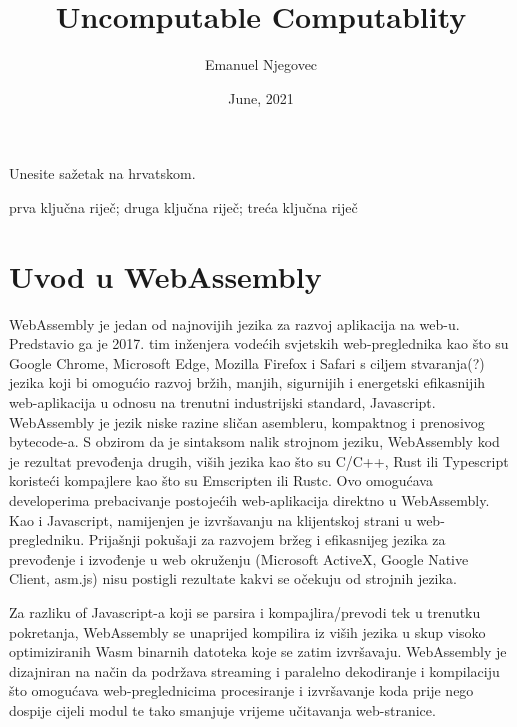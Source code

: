 \documentclass[seminarskirad]{fer}
\title{Uncomputable Computablity}
\author{Emanuel Njegovec}
\date{June, 2021}
\begin{document}
\maketitle


\mainmatter



\begin{sazetak}
  Unesite sažetak na hrvatskom.

  \blindtext
\end{sazetak}

\begin{kljucnerijeci}
  prva ključna riječ; druga ključna riječ; treća ključna riječ
\end{kljucnerijeci}


\tableofcontents


\chapter{Uvod u WebAssembly}
\label{pog:uvod}

WebAssembly je jedan od najnovijih jezika za razvoj aplikacija na web-u. Predstavio ga je 2017. tim inženjera vodećih svjetskih web-preglednika kao što su Google Chrome, Microsoft Edge, Mozilla Firefox i Safari s ciljem stvaranja(?) jezika koji bi omogućio razvoj bržih, manjih, sigurnijih i energetski efikasnijih web-aplikacija u odnosu na trenutni industrijski standard, Javascript. WebAssembly je jezik niske razine sličan asembleru, kompaktnog i prenosivog bytecode-a. S obzirom da je sintaksom nalik strojnom jeziku, WebAssembly kod je rezultat prevođenja drugih, viših jezika kao što su C/C++, Rust ili Typescript koristeći kompajlere kao što su Emscripten ili Rustc. Ovo omogućava developerima prebacivanje postojećih web-aplikacija direktno u WebAssembly. Kao i Javascript, namijenjen je izvršavanju na klijentskoj strani u web-pregledniku. Prijašnji pokušaji za razvojem bržeg i efikasnijeg jezika za prevođenje i izvođenje u web okruženju (Microsoft ActiveX, Google Native Client, asm.js) nisu postigli rezultate kakvi se očekuju od strojnih jezika.

Za razliku of Javascript-a koji se parsira i kompajlira/prevodi tek u trenutku pokretanja, WebAssembly se unaprijed kompilira iz viših jezika u skup visoko optimiziranih Wasm binarnih datoteka koje se zatim izvršavaju. WebAssembly je dizajniran na način da podržava streaming i paralelno dekodiranje i kompilaciju što omogućava web-preglednicima procesiranje i izvršavanje koda prije nego dospije cijeli modul te tako smanjuje vrijeme učitavanja web-stranice.
\end{document}
